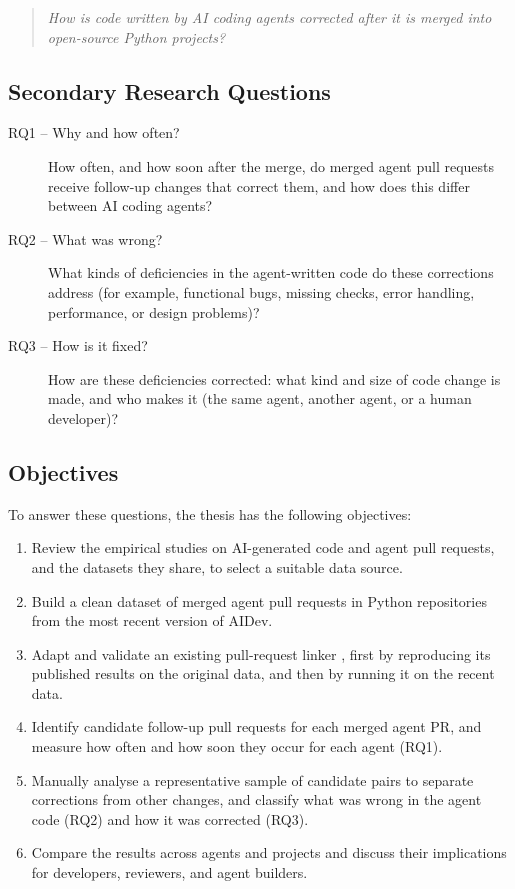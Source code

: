 \begin{quote}
\emph{How is code written by AI coding agents corrected after it is merged into
open-source Python projects?}
\end{quote}

\subsection{Secondary Research Questions}
\label{subsec:secondary-research-questions}

\begin{description}
  \item[RQ1 -- Why and how often?] How often, and how soon after the merge, do
  merged agent pull requests receive follow-up changes that correct them, and
  how does this differ between AI coding agents?
  \item[RQ2 -- What was wrong?] What kinds of deficiencies in the agent-written
  code do these corrections address (for example, functional bugs, missing
  checks, error handling, performance, or design problems)?
  \item[RQ3 -- How is it fixed?] How are these deficiencies corrected: what kind
  and size of code change is made, and who makes it (the same agent, another
  agent, or a human developer)?
\end{description}

\subsection{Objectives}
\label{subsec:objectives}

To answer these questions, the thesis has the following objectives:

\begin{enumerate}
  \item Review the empirical studies on AI-generated code and agent pull
  requests, and the datasets they share, to select a suitable data source.
  \item Build a clean dataset of merged agent pull requests in Python
  repositories from the most recent version of AIDev.
  \item Adapt and validate an existing pull-request linker
  \cite{takerngsaksiri2026finishes}, first by reproducing its published results
  on the original data, and then by running it on the recent data.
  \item Identify candidate follow-up pull requests for each merged agent PR, and
  measure how often and how soon they occur for each agent (RQ1).
  \item Manually analyse a representative sample of candidate pairs to separate
  corrections from other changes, and classify what was wrong in the agent code
  (RQ2) and how it was corrected (RQ3).
  \item Compare the results across agents and projects and discuss their
  implications for developers, reviewers, and agent builders.
\end{enumerate}

